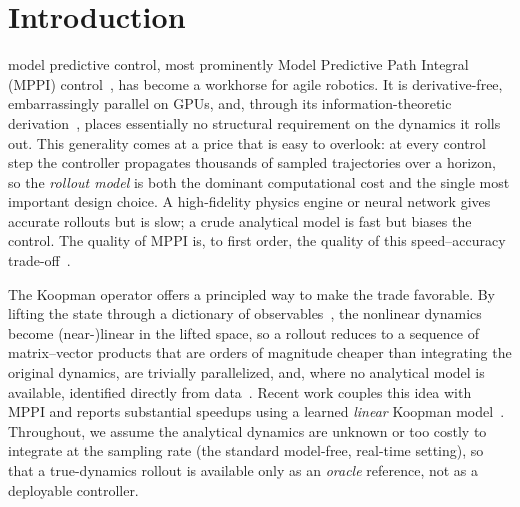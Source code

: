 \documentclass[lettersize,journal]{IEEEtran}
\theoremstyle{remark}
\begin{document}
\section{Introduction}\label{sec:intro}
 model predictive control, most prominently Model Predictive Path Integral (MPPI) control~\cite{williams2016aggressive,williams2017mppi,williams2018mppi}, has become a workhorse for agile robotics.
It is derivative-free, embarrassingly parallel on GPUs, and, through its information-theoretic derivation~\cite{kappen2005,theodorou2010}, places essentially no structural requirement on the dynamics it rolls out.
This generality comes at a price that is easy to overlook: at every control step the controller propagates thousands of sampled trajectories over a horizon, so the \emph{rollout model} is both the dominant computational cost and the single most important design choice.
A high-fidelity physics engine or neural network gives accurate rollouts but is slow; a crude analytical model is fast but biases the control.
The quality of MPPI is, to first order, the quality of this speed--accuracy trade-off~\cite{park2026review}.

The Koopman operator offers a principled way to make the trade favorable.
By lifting the state through a dictionary of observables~\cite{koopman1931,mezic2005,williams2015edmd}, the nonlinear dynamics become (near-)linear in the lifted space, so a rollout reduces to a sequence of matrix--vector products that are orders of magnitude cheaper than integrating the original dynamics, are trivially parallelized, and, where no analytical model is available, identified directly from data~\cite{proctor2016dmdc,lusch2018deep}.
Recent work couples this idea with MPPI and reports substantial speedups using a learned \emph{linear} Koopman model~\cite{mppidk2026}.
Throughout, we assume the analytical dynamics are unknown or too costly to integrate at the sampling rate (the standard model-free, real-time setting), so that a true-dynamics rollout is available only as an \emph{oracle} reference, not as a deployable controller.
\end{document}
